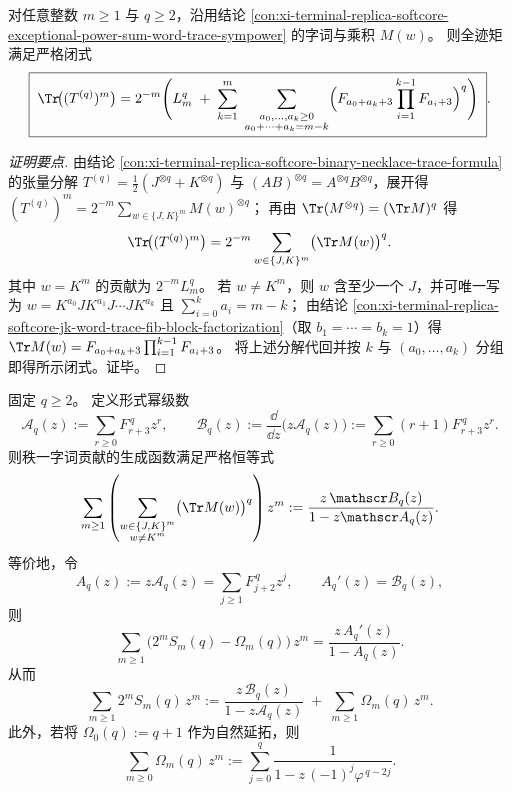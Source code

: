 \begin{conclusion}\label{con:xi-terminal-replica-softcore-trace-moment-linear-word-closed-form}
对任意整数 \(m\ge 1\) 与 \(q\ge 2\)，沿用结论 \ref{con:xi-terminal-replica-softcore-exceptional-power-sum-word-trace-sympower} 的字词与乘积 \(M(w)\)。
则全迹矩满足严格闭式
\[
\boxed{\;
\Tr\!\bigl((T^{(q)})^m\bigr)
=2^{-m}\Bigg(
L_m^{q}
\;+\;
\sum_{k=1}^{m}\ \sum_{\substack{a_0,\dots,a_k\ge 0\\ a_0+\cdots+a_k=m-k}}
\Bigl(F_{a_0+a_k+3}\prod_{i=1}^{k-1}F_{a_i+3}\Bigr)^{q}
\Bigg)\; } .
\]
\end{conclusion}
\begin{proof}[证明要点]
由结论 \ref{con:xi-terminal-replica-softcore-binary-necklace-trace-formula} 的张量分解
\(
T^{(q)}=\tfrac12(J^{\otimes q}+K^{\otimes q})
\)
与 \((AB)^{\otimes q}=A^{\otimes q}B^{\otimes q}\)，展开得
\(
(T^{(q)})^m=2^{-m}\sum_{w\in\{J,K\}^m}M(w)^{\otimes q}
\)；
再由 \(\Tr(M^{\otimes q})=(\Tr M)^q\) 得
\[
\Tr\!\bigl((T^{(q)})^m\bigr)=2^{-m}\sum_{w\in\{J,K\}^m}\bigl(\Tr M(w)\bigr)^q.
\]
其中 \(w=K^m\) 的贡献为 \(2^{-m}L_m^q\)。
若 \(w\neq K^m\)，则 \(w\) 含至少一个 \(J\)，并可唯一写为
\(
w=K^{a_0}JK^{a_1}J\cdots JK^{a_k}
\)
且 \(\sum_{i=0}^{k}a_i=m-k\)；
由结论 \ref{con:xi-terminal-replica-softcore-jk-word-trace-fib-block-factorization}（取 \(b_1=\cdots=b_k=1\)）得
\(
\Tr M(w)=F_{a_0+a_k+3}\prod_{i=1}^{k-1}F_{a_i+3}
\)。
将上述分解代回并按 \(k\) 与 \((a_0,\dots,a_k)\) 分组即得所示闭式。证毕。
\end{proof}
\begin{conclusion}\label{con:xi-terminal-replica-softcore-exceptional-power-sum-m-direction-genfunc}
固定 \(q\ge 2\)。
定义形式幂级数
\[
\mathscr A_q(z):=\sum_{r\ge 0}F_{r+3}^{\,q} z^{r},
\qquad
\mathscr B_q(z):=\frac{\dd}{\dd z}\bigl(z\mathscr A_q(z)\bigr)
:=\sum_{r\ge 0}(r+1)F_{r+3}^{\,q} z^{r}.
\]
则秩一字词贡献的生成函数满足严格恒等式
\[
\sum_{m\ge 1}\left(\sum_{\substack{w\in\{J,K\}^m\\ w\neq K^m}}\bigl(\Tr M(w)\bigr)^q\right) z^{m}
:=\frac{z\,\mathscr B_q(z)}{1-z\mathscr A_q(z)}.
\]
等价地，令
\[
A_q(z):=z\mathscr A_q(z)=\sum_{j\ge 1}F_{j+2}^{\,q} z^{j},
\qquad
A_q'(z)=\mathscr B_q(z),
\]
则
\[
\sum_{m\ge 1}\bigl(2^m S_m(q)-\Omega_m(q)\bigr)\,z^m
=\frac{z\,A_q'(z)}{1-A_q(z)}.
\]
从而
\[
\sum_{m\ge 1}2^m S_m(q)\,z^m
:=\frac{z\,\mathscr B_q(z)}{1-z\mathscr A_q(z)}
\;+\;
\sum_{m\ge 1}\Omega_m(q)\,z^m.
\]
此外，若将 \(\Omega_0(q):=q+1\) 作为自然延拓，则
\[
\sum_{m\ge 0}\Omega_m(q)\,z^m
:=\sum_{j=0}^{q}\frac{1}{1-z\,(-1)^j\varphi^{\,q-2j}}.
\]
\end{conclusion}
